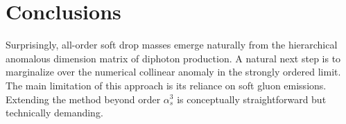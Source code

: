 \section{Conclusions}\label{sec:conclusions}

Surprisingly, all-order soft drop masses emerge naturally from the
hierarchical anomalous dimension matrix of diphoton production. A
natural next step is to marginalize over the numerical collinear anomaly
in the strongly ordered limit. The main limitation of this approach is
its reliance on soft gluon emissions. Extending the method beyond order
$\alpha_s^3$ is conceptually straightforward but technically demanding.

